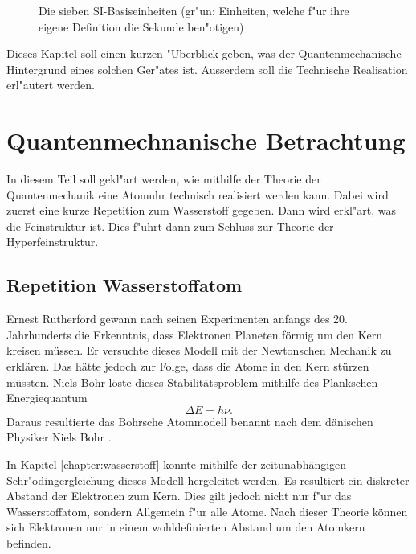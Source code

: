 \begin{refsection}
\begin{figure}
  \caption{Die sieben SI-Basiseinheiten (gr"un: Einheiten, welche f"ur
    ihre eigene Definition die Sekunde ben"otigen)}
  \label{fig:siBasis}
\end{figure}

Dieses Kapitel soll einen kurzen "Uberblick geben, was der Quantenmechanische Hintergrund eines solchen Ger"ates ist. Ausserdem soll die Technische Realisation erl"autert werden.


\section{Quantenmechnanische Betrachtung}

In diesem Teil soll gekl"art werden, wie mithilfe der Theorie der Quantenmechanik eine Atomuhr technisch realisiert werden kann. Dabei wird zuerst eine kurze Repetition zum Wasserstoff gegeben. Dann wird erkl"art, was die Feinstruktur ist. Dies f"uhrt dann zum Schluss zur Theorie der Hyperfeinstruktur.

\subsection{Repetition Wasserstoffatom}
Ernest Rutherford gewann nach seinen Experimenten anfangs des 20. Jahrhunderts die Erkenntnis, dass Elektronen Planeten förmig um den Kern kreisen müssen. 
Er versuchte dieses Modell mit der Newtonschen Mechanik zu erklären. 
Das hätte jedoch zur Folge, dass die Atome in den Kern stürzen müssten. 
Niels Bohr löste dieses Stabilitätsproblem mithilfe des Plankschen Energiequantum 
\begin{equation}
\varDelta E = h\nu.
\end{equation}
Daraus resultierte das Bohrsche Atommodell benannt nach dem dänischen Physiker Niels Bohr \cite{wiki:bohr}. 

In Kapitel \ref{chapter:wasserstoff} konnte mithilfe der zeitunabhängigen Schr"odingergleichung dieses Modell hergeleitet werden.
Es resultiert ein diskreter Abstand der Elektronen zum Kern.
Dies gilt jedoch nicht nur f"ur das Wasserstoffatom, sondern Allgemein f"ur alle Atome.
Nach dieser Theorie können sich Elektronen nur in einem wohldefinierten Abstand um den Atomkern befinden. 


\end{refsection}
